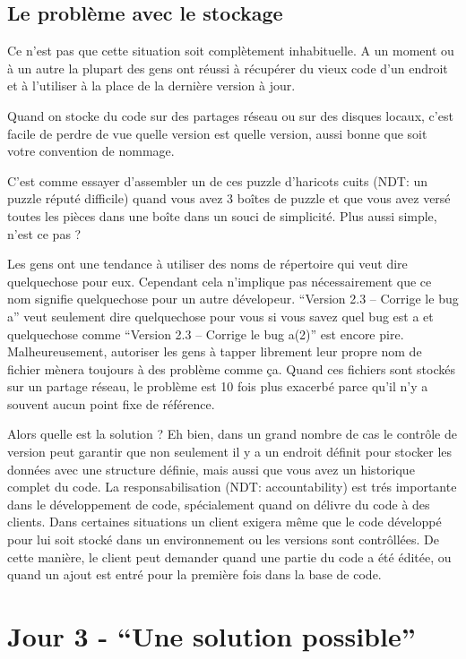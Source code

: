 \subsection{Le problème avec le stockage}
Ce n'est pas que cette situation soit complètement inhabituelle.
A un moment ou à un autre la plupart des gens ont réussi à récupérer du vieux code d'un endroit et à l'utiliser à la place de la dernière version à jour.

Quand on stocke du code sur des partages réseau ou sur des disques locaux, c'est facile de perdre de vue quelle version est quelle version,  
aussi bonne que soit votre convention de nommage.

C'est comme essayer d'assembler un de ces puzzle d'haricots cuits (NDT: un puzzle réputé difficile) quand vous avez 3 boîtes de puzzle et que vous avez versé toutes les pièces dans une boîte dans un souci de simplicité.
Plus aussi simple, n'est ce pas ?

Les gens ont une tendance à utiliser des noms de répertoire qui veut dire quelquechose pour eux.
Cependant cela n'implique pas nécessairement que ce nom signifie quelquechose pour un autre dévelopeur.
``Version 2.3 -- Corrige le bug a'' veut seulement dire quelquechose pour vous si vous savez quel bug est a et quelquechose comme
``Version 2.3 -- Corrige le bug a(2)'' est encore pire.
Malheureusement, autoriser les gens à tapper librement leur propre nom de fichier mènera toujours à des problème comme ça.
Quand ces fichiers sont stockés sur un partage réseau, le problème est 10 fois plus exacerbé parce qu'il n'y a souvent aucun point fixe de référence.

Alors quelle est la solution ? Eh bien, dans un grand nombre de cas le contrôle de version peut garantir que non seulement il y a un endroit définit pour stocker les données avec une structure définie, mais aussi que vous avez un historique complet du code.
La responsabilisation (NDT: accountability) est trés importante dans le développement de code, spécialement quand on délivre du code à des clients.
Dans certaines situations un client exigera même que le code développé pour lui soit stocké dans un environnement ou les versions sont contrôllées.
De cette manière, le client peut demander quand une partie du code a été éditée, ou quand un ajout est entré pour la première fois dans la base de code.

\section{Jour 3 - ``Une solution possible''}
